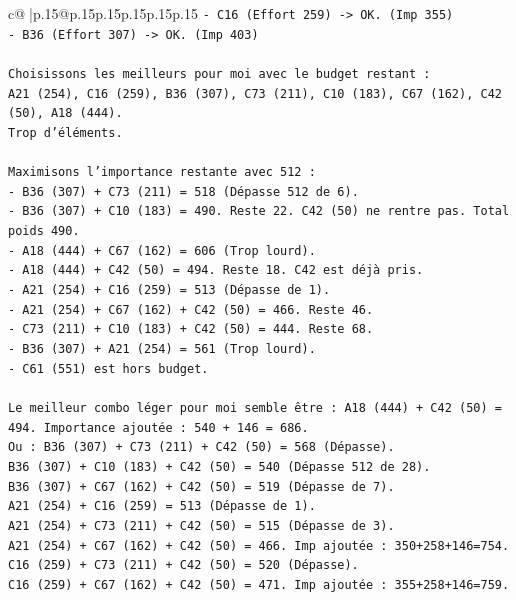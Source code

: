 \documentclass{article}
\begin{document}
{\begin{supertabular}{c@{$\;$}|p{.15\linewidth}@{}p{.15\linewidth}p{.15\linewidth}p{.15\linewidth}p{.15\linewidth}p{.15\linewidth}}
{{{\texttt{{-} C16 (Effort 259) {-}> OK. (Imp 355)} \\
\texttt{{-} B36 (Effort 307) {-}> OK. (Imp 403)} \\
\\ 
\texttt{Choisissons les meilleurs pour moi avec le budget restant :} \\
\texttt{A21 (254), C16 (259), B36 (307), C73 (211), C10 (183), C67 (162), C42 (50), A18 (444).} \\
\texttt{Trop d'éléments.} \\
\\ 
\texttt{Maximisons l'importance restante avec 512 :} \\
\texttt{{-} B36 (307) + C73 (211) = 518 (Dépasse 512 de 6).} \\
\texttt{{-} B36 (307) + C10 (183) = 490. Reste 22. C42 (50) ne rentre pas. Total poids 490.} \\
\texttt{{-} A18 (444) + C67 (162) = 606 (Trop lourd).} \\
\texttt{{-} A18 (444) + C42 (50) = 494. Reste 18. C42 est déjà pris.} \\
\texttt{{-} A21 (254) + C16 (259) = 513 (Dépasse de 1).} \\
\texttt{{-} A21 (254) + C67 (162) + C42 (50) = 466. Reste 46.} \\
\texttt{{-} C73 (211) + C10 (183) + C42 (50) = 444. Reste 68.} \\
\texttt{{-} B36 (307) + A21 (254) = 561 (Trop lourd).} \\
\texttt{{-} C61 (551) est hors budget.} \\
\\ 
\texttt{Le meilleur combo léger pour moi semble être : A18 (444) + C42 (50) = 494. Importance ajoutée : 540 + 146 = 686.} \\
\texttt{Ou : B36 (307) + C73 (211) + C42 (50) = 568 (Dépasse).} \\
\texttt{B36 (307) + C10 (183) + C42 (50) = 540 (Dépasse 512 de 28).} \\
\texttt{B36 (307) + C67 (162) + C42 (50) = 519 (Dépasse de 7).} \\
\texttt{A21 (254) + C16 (259) = 513 (Dépasse de 1).} \\
\texttt{A21 (254) + C73 (211) + C42 (50) = 515 (Dépasse de 3).} \\
\texttt{A21 (254) + C67 (162) + C42 (50) = 466. Imp ajoutée : 350+258+146=754.} \\
\texttt{C16 (259) + C73 (211) + C42 (50) = 520 (Dépasse).} \\
\texttt{C16 (259) + C67 (162) + C42 (50) = 471. Imp ajoutée : 355+258+146=759.} \\
}}}
\end{supertabular}}
\end{document}

